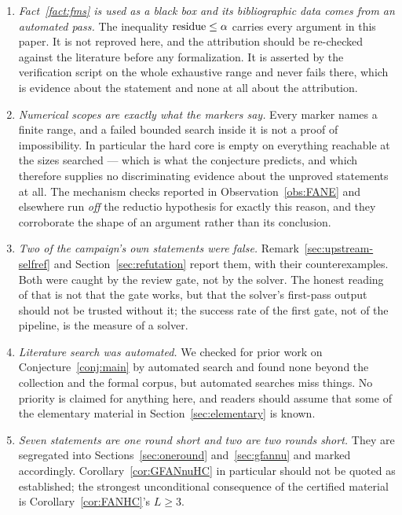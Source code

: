 \begin{enumerate}
\item \emph{Fact~\ref{fact:fms} is used as a black box and its bibliographic data comes from
an automated pass.} The inequality $\operatorname{residue} \le \alpha$ carries every argument in this paper.
It is not reproved here, and the attribution should be re-checked against the literature
before any formalization. It is asserted by the verification script on the whole exhaustive
range and never fails there, which is evidence about the statement and none at all about the
attribution.

\item \emph{Numerical scopes are exactly what the markers say.} Every
\Scomp{\dots} marker names a finite range, and a failed bounded search inside it is not a
proof of impossibility. In particular the hard core is empty on everything reachable at the
sizes searched --- which is what the conjecture predicts, and which therefore supplies no
discriminating evidence about the unproved statements at all. The mechanism checks reported
in Observation~\ref{obs:FANE} and elsewhere run \emph{off} the reductio hypothesis for
exactly this reason, and they corroborate the shape of an argument rather than its
conclusion.

\item \emph{Two of the campaign's own statements were false.} Remark~\ref{sec:upstream-selfref}
and Section~\ref{sec:refutation} report them, with their counterexamples. Both were caught
by the review gate, not by the solver. The honest reading of that is not that the gate
works, but that the solver's first-pass output should not be trusted without it; the
success rate of the first gate, not of the pipeline, is the measure of a solver.

\item \emph{Literature search was automated.} We checked for prior work on
Conjecture~\ref{conj:main} by automated search and found none beyond the collection and the
formal corpus, but automated searches miss things. No priority is claimed for anything here,
and readers should assume that some of the elementary material in
Section~\ref{sec:elementary} is known.

\item \emph{Seven statements are one round short and two are two rounds short.} They are
segregated into Sections~\ref{sec:oneround} and~\ref{sec:gfannu} and marked accordingly.
Corollary~\ref{cor:GFANnuHC} in particular should not be quoted as established; the
strongest unconditional consequence of the certified material is
Corollary~\ref{cor:FANHC}'s $L \ge 3$.
\end{enumerate}

